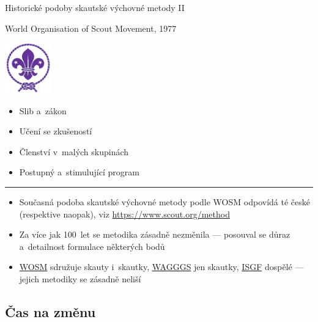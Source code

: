 \documentclass[compress, ucs, xelatex, xcolor=dvipsnames, print,
  hyperref={
    bookmarks=true,
    unicode=true,
    colorlinks=true,
    plainpages=false,
    pdfkeywords={Junak, Pedagogika, Skaut, Skauting, Vychovna metoda},
    linkcolor=Black,
    anchorcolor=Black,
    citecolor=OliveGreen,
    filecolor=OliveGreen,
    menucolor=Black,
    urlcolor=OliveGreen,
    pdftex}
  ]{beamer}
\begin{document}
\begin{frame}{Historické podoby skautské výchovné metody II}
  \begin{multicols}{2}
    World Organisation of Scout Movement, 1977
    \begin{center}
      \includegraphics[width=2cm]{wosm.jpg}
    \end{center}
    \begin{itemize}
      \item Slib a~zákon
      \item Učení se zkušeností
      \item Členství v~malých skupinách
      \item Postupný a~stimulující program
    \end{itemize}
  \end{multicols}
  \hrule
  \begin{itemize}
    \item Současná podoba skautské výchovné metody podle WOSM odpovídá té české (respektive naopak), viz \url{https://www.scout.org/method}
    \item Za více jak 100~let se metodika zásadně nezměnila --- posouval se důraz a~detailnost formulace některých bodů
    \item \href{https://www.scout.org/}{WOSM} sdružuje skauty i~skautky, \href{https://www.wagggs.org/}{WAGGGS} jen skautky, \href{http://www.isgf.org/}{ISGF} dospělé --- jejich metodiky se zásadně neliší
  \end{itemize}
\end{frame}

\subsection{Čas na změnu}
\end{document}
